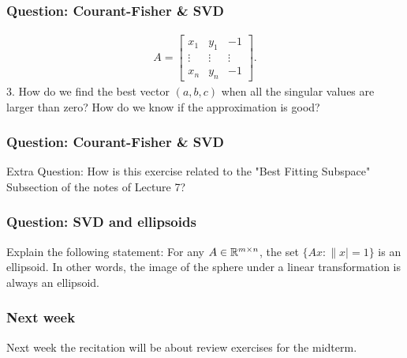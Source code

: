 \documentclass{beamer}
\begin{document}
\begin{frame}[t]
\frametitle{Question: Courant-Fisher \& SVD}
\vspace{-20pt}
\begin{align*}
A = 
\begin{bmatrix}
x_1 & y_1 & -1 \\
\vdots & \vdots & \vdots \\ 
x_n & y_n & -1
\end{bmatrix}.
\end{align*}
3. How do we find the best vector $(a,b,c)$ when all the singular values are larger than zero? How do we know if the approximation is good?
\pause
\pause
\end{frame}

\begin{frame}[t]
\frametitle{Question: Courant-Fisher \& SVD}
Extra Question: How is this exercise related to the "Best Fitting Subspace" Subsection of the notes of Lecture 7?
\pause
\end{frame}



\begin{frame}[t]
\frametitle{Question: SVD and ellipsoids}
Explain the following statement: For any $A \in \mathbb{R}^{m \times n}$, the set $\{ Ax : \|x| = 1 \}$ is an ellipsoid. In other words, the image of the sphere under a linear transformation is always an ellipsoid.
\pause
\end{frame}

\begin{frame}[t]
\frametitle{Next week}
Next week the recitation will be about review exercises for the midterm.

\end{frame}
\end{document}
